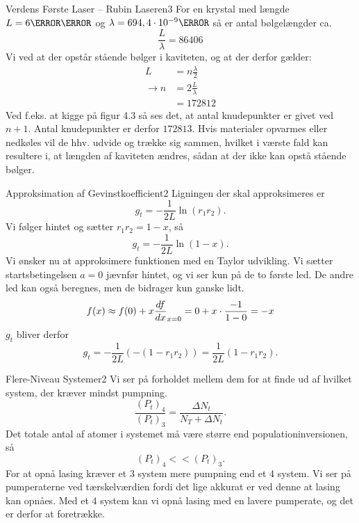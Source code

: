 \begin{opgave}{Verdens Første Laser -- Rubin Laseren}{3}
\opg For en krystal med længde $L=6\centi\meter$ og $\lambda = 694,4 \cdot 10^{-9} \m$ så er antal bølgelængder ca.
\begin{equation}
\frac{L}{\lambda} = 86406
\end{equation}
Vi ved at der opstår stående bølger i kaviteten, og at der derfor gælder:
\begin{align}
L &= n\frac{\lambda}{2} \\
\rightarrow n &= 2 \frac{L}{\lambda} \\
&= 172812 
\end{align}
Ved f.eks. at kigge på figur 4.3 så ses det, at antal knudepunkter er givet ved $n+1$. Antal knudepunkter er derfor $172813$.
\opg Hvis materialer opvarmes eller nedkøles vil de hhv. udvide og trække sig sammen, hvilket i værste fald kan resultere i, at længden af kaviteten ændres, sådan at der ikke kan opstå stående bølger.
\end{opgave}

\begin{opgave}{Approksimation af Gevinstkoefficient}{2}
\opg Ligningen der skal approksimeres er 
\begin{equation}
g_t = -\frac{1}{2L}\ln(r_1r_2). 
\end{equation}
Vi følger hintet og sætter $r_1r_2 = 1-x$, så 
\begin{equation}
g_t = -\frac{1}{2L}\ln(1-x). 
\end{equation}
Vi ønsker nu at approksimere funktionen med en Taylor udvikling. Vi sætter startsbetingelsen $a=0$ jævnfør hintet, og vi ser kun på de to første led. De andre led kan også beregnes, men de bidrager kun ganske lidt. 
\begin{equation}
f(x) \approx f(0) + x{d{f} \over d{x}}_{x=0} = 0 + x\cdot \frac{-1}{1-0} = -x
\end{equation}
$g_t$ bliver derfor 
\begin{equation}
g_t = -\frac{1}{2L}(-(1-r_1r_2)) = \frac{1}{2L}(1-r_1r_2). 
\end{equation}
\end{opgave}

\begin{opgave}{Flere-Niveau Systemer}{2}
\opg Vi ser på forholdet mellem dem for at finde ud af hvilket system, der kræver mindst pumpning. 
\begin{equation}
\frac{(P_t)_4}{(P_t)_3} = \frac{\Delta N_t}{N_T + \Delta N_t}.
\end{equation}
Det totale antal af atomer i systemet må være større end populationinversionen, så 
\begin{equation}
(P_t)_4 << (P_t)_3.
\end{equation}
For at opnå lasing kræver et 3 system mere pumpning end et 4 system. 
Vi ser på pumperaterne ved tærskelværdien fordi det lige akkurat er ved denne at lasing kan opnåes. 
\opg Med et 4 system kan vi opnå lasing med en lavere pumperate, og det er derfor at foretrække. 
\end{opgave}

